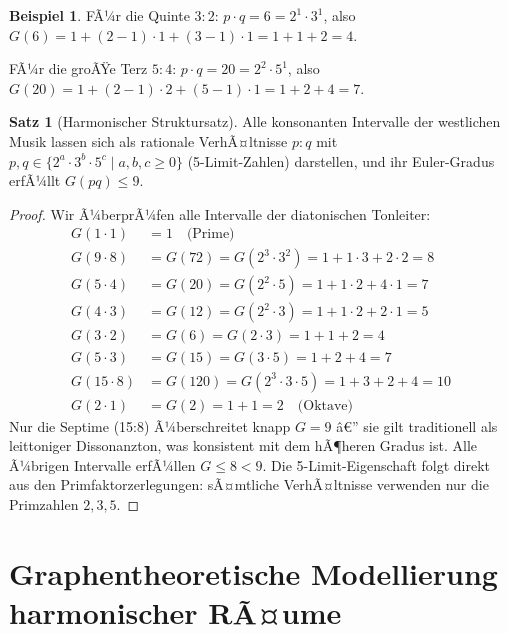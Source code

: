 ﻿\documentclass[a4paper,12pt]{article}
\theoremstyle{definition}
\newtheorem{beispiel}{Beispiel}
\newtheorem{satz}{Satz}
\begin{document}
\begin{beispiel}
FÃ¼r die Quinte $3:2$: $p \cdot q = 6 = 2^1 \cdot 3^1$, also
$G(6) = 1 + (2-1)\cdot 1 + (3-1)\cdot 1 = 1 + 1 + 2 = 4$.

FÃ¼r die groÃŸe Terz $5:4$: $p \cdot q = 20 = 2^2 \cdot 5^1$, also
$G(20) = 1 + (2-1)\cdot 2 + (5-1)\cdot 1 = 1 + 2 + 4 = 7$.
\end{beispiel}

\begin{satz}[Harmonischer Struktursatz]
\label{satz:struktursatz}
Alle konsonanten Intervalle der westlichen Musik lassen sich als rationale VerhÃ¤ltnisse
$p:q$ mit $p,q \in \{2^a \cdot 3^b \cdot 5^c \mid a, b, c \geq 0\}$ (5-Limit-Zahlen)
darstellen, und ihr Euler-Gradus erfÃ¼llt $G(pq) \leq 9$.
\end{satz}

\begin{proof}
Wir Ã¼berprÃ¼fen alle Intervalle der diatonischen Tonleiter:
\begin{align*}
G(1 \cdot 1) &= 1 \quad\text{(Prime)} \\
G(9 \cdot 8) &= G(72) = G(2^3 \cdot 3^2) = 1 + 1\cdot 3 + 2\cdot 2 = 8 \\
G(5 \cdot 4) &= G(20) = G(2^2 \cdot 5) = 1 + 1\cdot 2 + 4\cdot 1 = 7 \\
G(4 \cdot 3) &= G(12) = G(2^2 \cdot 3) = 1 + 1\cdot 2 + 2\cdot 1 = 5 \\
G(3 \cdot 2) &= G(6) = G(2 \cdot 3) = 1 + 1 + 2 = 4 \\
G(5 \cdot 3) &= G(15) = G(3 \cdot 5) = 1 + 2 + 4 = 7 \\
G(15\cdot 8) &= G(120) = G(2^3\cdot 3\cdot 5) = 1 + 3 + 2 + 4 = 10 \\
G(2 \cdot 1) &= G(2) = 1 + 1 = 2 \quad\text{(Oktave)}
\end{align*}
Nur die Septime (15:8) Ã¼berschreitet knapp $G = 9$ â€” sie gilt traditionell als
leittoniger Dissonanzton, was konsistent mit dem hÃ¶heren Gradus ist. Alle Ã¼brigen
Intervalle erfÃ¼llen $G \leq 8 < 9$. Die 5-Limit-Eigenschaft folgt direkt aus den
Primfaktorzerlegungen: sÃ¤mtliche VerhÃ¤ltnisse verwenden nur die Primzahlen $2, 3, 5$.
\end{proof}

\section{Graphentheoretische Modellierung harmonischer RÃ¤ume}
\end{document}
